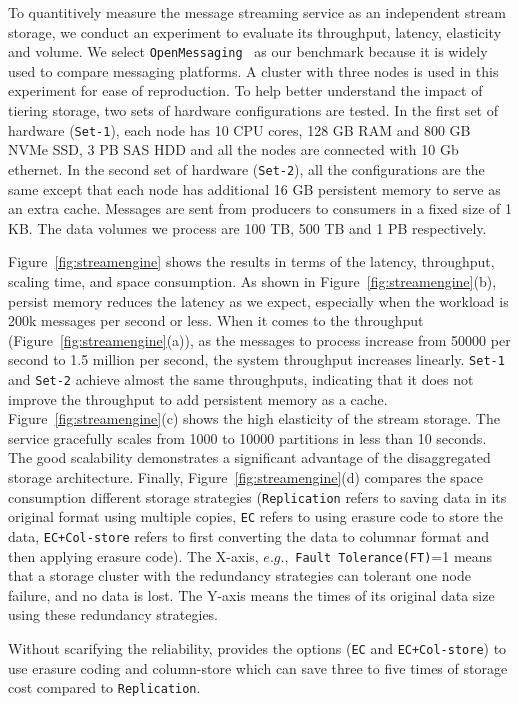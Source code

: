 To quantitively measure the message streaming service as an independent stream storage, we conduct an experiment to evaluate its throughput, latency, elasticity and volume. We select \texttt{OpenMessaging}~\cite{} as our benchmark  because it is widely used to compare messaging platforms. A cluster with three nodes is used in this experiment for  ease of reproduction.
 To help better understand the impact of tiering storage, two sets of hardware configurations are tested. In the first set of hardware (\texttt{Set-1}), each node has 10 CPU cores, 128 GB RAM and 800 GB NVMe SSD, 3 PB SAS HDD and all the nodes are connected with 10 Gb ethernet. In the second set of hardware (\texttt{Set-2}), all the configurations are the same except that each node has additional 16 GB persistent memory to serve as an extra cache. Messages are sent from producers to consumers in a fixed size of 1 KB. The data volumes we process are 100 TB, 500 TB and 1 PB respectively. 


Figure~\ref{fig:streamengine} shows the results in terms of  the latency, throughput, scaling time, and space consumption.
As shown in Figure~\ref{fig:streamengine}(b), persist memory reduces the latency as we expect, especially when the workload is 200k messages per second or less.
When it comes to the throughput (Figure~\ref{fig:streamengine}(a)), as the messages to process increase from 50000 per second to 1.5 million per second, the system throughput increases linearly. 
\texttt{Set-1} and \texttt{Set-2} achieve almost the same throughputs, indicating that it does not improve the throughput to add persistent memory as a cache. 
 Figure~\ref{fig:streamengine}(c) shows the high elasticity of the stream storage. The service gracefully scales from 1000 to 10000 partitions in less than 10 seconds. The good scalability  demonstrates a significant advantage of the   disaggregated storage architecture. 
Finally, Figure~\ref{fig:streamengine}(d) compares the space consumption different storage strategies (\texttt{Replication} refers to  saving data in its original format using multiple copies, \texttt{EC} refers to using erasure code to store the data, \texttt{EC+Col-store} refers to first converting the data to columnar format and then applying erasure code). 
The X-axis, $e.g.,$ \texttt{Fault Tolerance(FT)}=1 means that a storage cluster with the redundancy strategies can tolerant one node failure, and no data is lost.
The  Y-axis means  the times of its original data size   using these redundancy strategies.


 Without scarifying the reliability, \sys provides the options (\texttt{EC} and \texttt{EC+Col-store}) to use erasure coding and column-store which can save three to five times of storage cost compared to \texttt{Replication}. 






